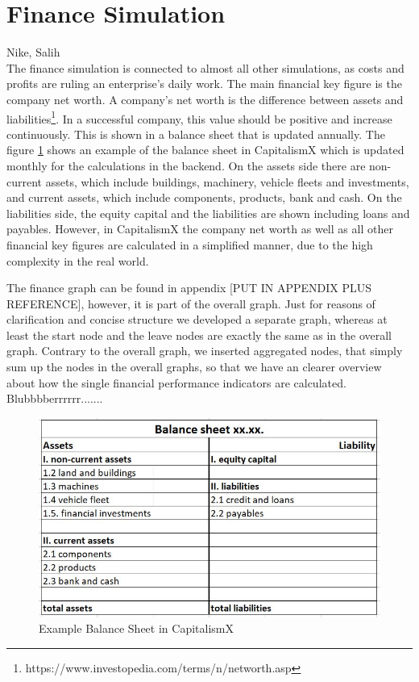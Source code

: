 \section{Finance Simulation}
\label{sec:diag}
Nike, Salih\\

The finance simulation is connected to almost all other simulations, as costs and profits are ruling an enterprise's daily work. The main financial key figure is the company net worth. A company's net worth is the difference between assets and liabilities\footnote{https://www.investopedia.com/terms/n/networth.asp}. In a successful company, this value should be positive and increase continuously. This is shown in a balance sheet that is updated annually. The figure \ref{fig:BalanceSheet} shows an example of the balance sheet in CapitalismX which is updated monthly for the calculations in the backend. On the assets side there are non-current assets, which include buildings, machinery, vehicle fleets and investments, and current assets, which include components, products, bank and cash. On the liabilities side, the equity capital and the liabilities are shown including loans and payables. However, in CapitalismX the company net worth as well as all other financial key figures are calculated in a simplified manner, due to the high complexity in the real world.

The finance graph can be found in appendix [PUT IN APPENDIX PLUS REFERENCE], however, it is part of the overall graph. Just for reasons of clarification and concise structure we developed a separate graph, whereas at least the start node and the leave nodes are exactly the same as in the overall graph. Contrary to the overall graph, we inserted aggregated nodes, that simply sum up the nodes in the overall graphs, so that we have an clearer overview about how the single financial performance indicators are calculated. Blubbbberrrrrr.......


\begin{figure}
\label{fig:BalanceSheet}
	\centering
	\includegraphics[width=12cm]{images/balance sheet.JPG}
	\caption{Example Balance Sheet in CapitalismX}
\end{figure}

